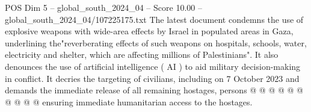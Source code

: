 \begin{textsample}{POS Dim 5 – global\_south\_2024\_04 – Score 10.00 – global\_south\_2024\_04/107225175.txt}
The latest document condemns the use of explosive weapons with wide-area effects by Israel in populated areas in Gaza, underlining the"reverberating effects of such weapons on hospitals, schools, water, electricity and shelter, which are affecting millions of Palestinians".
It also denounces the use of artificial intelligence ( AI ) to aid military decision-making in conflict.
It decries the targeting of civilians, including on 7 October 2023 and demands the immediate release of all remaining hostages, persons @ @ @ @ @ @ @ @ @ @ ensuring immediate humanitarian access to the hostages.

\end{textsample}
